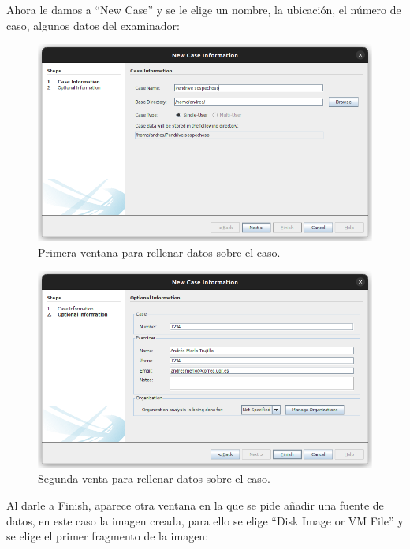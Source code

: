 \documentclass{article}
\begin{document}
\newpage

Ahora le damos a ``New Case'' y se le elige un nombre, la ubicación, el número de caso, algunos datos del examinador:

\begin{figure}[H]
    \centering
    \includegraphics[width=\textwidth]{imagenes/Captura desde 2022-12-03 21-42-29.png}
    \caption{Primera ventana para rellenar datos sobre el caso.}
\end{figure}

\begin{figure}[H]
    \centering
    \includegraphics[width=\textwidth]{imagenes/Captura desde 2022-12-03 21-43-15.png}
    \caption{Segunda venta para rellenar datos sobre el caso.}
\end{figure}

\newpage

Al darle a Finish, aparece otra ventana en la que se pide añadir una fuente de datos, en este caso la imagen creada, para ello se elige ``Disk Image or VM File'' y se elige el primer fragmento de la imagen:
\end{document}

